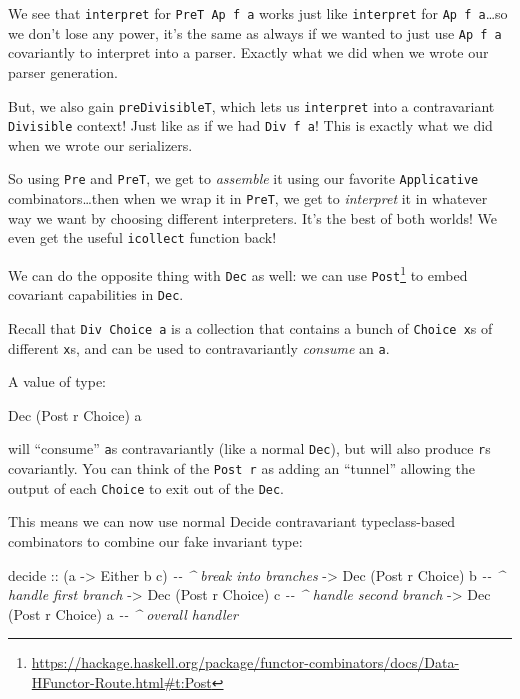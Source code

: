 \documentclass[]{article}
\newenvironment{Shaded}{}{}
\newcommand{\CommentTok}[1]{\textcolor[rgb]{0.38,0.63,0.69}{\textit{#1}}}
\newcommand{\DataTypeTok}[1]{\textcolor[rgb]{0.56,0.13,0.00}{#1}}
\newcommand{\NormalTok}[1]{#1}
\newcommand{\OtherTok}[1]{\textcolor[rgb]{0.00,0.44,0.13}{#1}}
\renewcommand{\href}[2]{#2\footnote{\url{#1}}}
\begin{document}
We see that \texttt{interpret} for \texttt{PreT\ Ap\ f\ a} works just like
\texttt{interpret} for \texttt{Ap\ f\ a}\ldots so we don't lose any power, it's
the same as always if we wanted to just use \texttt{Ap\ f\ a} covariantly to
interpret into a parser. Exactly what we did when we wrote our parser
generation.

But, we also gain \texttt{preDivisibleT}, which lets us \texttt{interpret} into
a contravariant \texttt{Divisible} context! Just like as if we had
\texttt{Div\ f\ a}! This is exactly what we did when we wrote our serializers.

So using \texttt{Pre} and \texttt{PreT}, we get to \emph{assemble} it using our
favorite \texttt{Applicative} combinators\ldots then when we wrap it in
\texttt{PreT}, we get to \emph{interpret} it in whatever way we want by choosing
different interpreters. It's the best of both worlds! We even get the useful
\texttt{icollect} function back!

We can do the opposite thing with \texttt{Dec} as well: we can use
\href{https://hackage.haskell.org/package/functor-combinators/docs/Data-HFunctor-Route.html\#t:Post}{\texttt{Post}}
to embed covariant capabilities in \texttt{Dec}.

Recall that \texttt{Div\ Choice\ a} is a collection that contains a bunch of
\texttt{Choice\ x}s of different \texttt{x}s, and can be used to contravariantly
\emph{consume} an \texttt{a}.

A value of type:

\begin{Shaded}
\begin{Highlighting}[]
\DataTypeTok{Dec}\NormalTok{ (}\DataTypeTok{Post}\NormalTok{ r }\DataTypeTok{Choice}\NormalTok{) a}
\end{Highlighting}
\end{Shaded}

will ``consume'' \texttt{a}s contravariantly (like a normal \texttt{Dec}), but
will also produce \texttt{r}s covariantly. You can think of the \texttt{Post\ r}
as adding an ``tunnel'' allowing the output of each \texttt{Choice} to exit out
of the \texttt{Dec}.

This means we can now use normal Decide contravariant typeclass-based
combinators to combine our fake invariant type:

\begin{Shaded}
\begin{Highlighting}[]
\NormalTok{decide}
\OtherTok{    ::}\NormalTok{ (a }\OtherTok{{-}>} \DataTypeTok{Either}\NormalTok{ b c)        }\CommentTok{{-}{-} \^{} break into branches}
    \OtherTok{{-}>} \DataTypeTok{Dec}\NormalTok{ (}\DataTypeTok{Post}\NormalTok{ r }\DataTypeTok{Choice}\NormalTok{) b    }\CommentTok{{-}{-} \^{} handle first branch}
    \OtherTok{{-}>} \DataTypeTok{Dec}\NormalTok{ (}\DataTypeTok{Post}\NormalTok{ r }\DataTypeTok{Choice}\NormalTok{) c    }\CommentTok{{-}{-} \^{} handle second branch}
    \OtherTok{{-}>} \DataTypeTok{Dec}\NormalTok{ (}\DataTypeTok{Post}\NormalTok{ r }\DataTypeTok{Choice}\NormalTok{) a    }\CommentTok{{-}{-} \^{} overall handler}
\end{Highlighting}
\end{Shaded}
\end{document}
